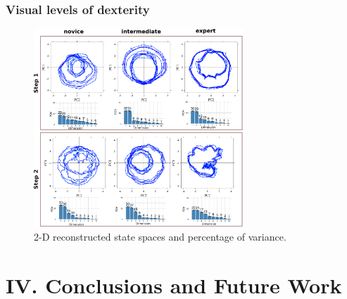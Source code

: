 \documentclass{beamer}
\begin{document}
\begin{frame}
\frametitle{Visual levels of dexterity}
\vspace{-0.9cm}


\begin{figure}[!htb]
\centering
\includegraphics[width=0.7\textwidth]{main_figure_horizontal02}
\caption[PA]{2-D reconstructed state spaces and percentage of variance.}

\label{fig:sn}
\end{figure}



\end{frame}






\section{IV. Conclusions and Future Work}
\end{document}
